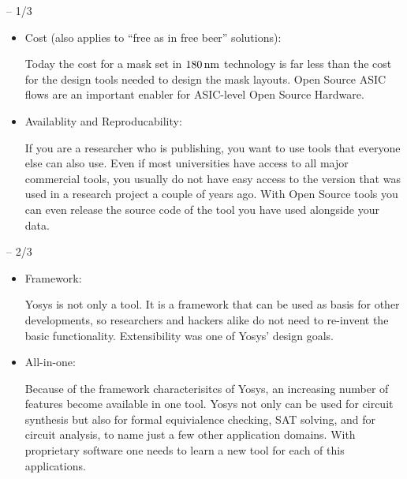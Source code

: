 \begin{frame}{\subsecname{} -- 1/3}
\begin{itemize}
\item Cost (also applies to ``free as in free beer'' solutions): \smallskip\par
Today the cost for a mask set in $\unit[180]{nm}$ technology is far less than
the cost for the design tools needed to design the mask layouts. Open Source
ASIC flows are an important enabler for ASIC-level Open Source Hardware.

\bigskip
\item Availablity and Reproducability: \smallskip\par
If you are a researcher who is publishing, you want to use tools that everyone
else can also use. Even if most universities have access to all major
commercial tools, you usually do not have easy access to the version that was
used in a research project a couple of years ago. With Open Source tools you
can even release the source code of the tool you have used alongside your data.
\end{itemize}
\end{frame}

\begin{frame}{\subsecname{} -- 2/3}
\begin{itemize}
\item Framework: \smallskip\par
Yosys is not only a tool. It is a framework that can be used as basis for other
developments, so researchers and hackers alike do not need to re-invent the
basic functionality. Extensibility was one of Yosys' design goals.

\bigskip
\item All-in-one: \smallskip\par
Because of the framework characterisitcs of Yosys, an increasing number of features
become available in one tool. Yosys not only can be used for circuit synthesis but
also for formal equivialence checking, SAT solving, and for circuit analysis, to
name just a few other application domains. With proprietary software one needs to
learn a new tool for each of this applications.
\end{itemize}
\end{frame}

